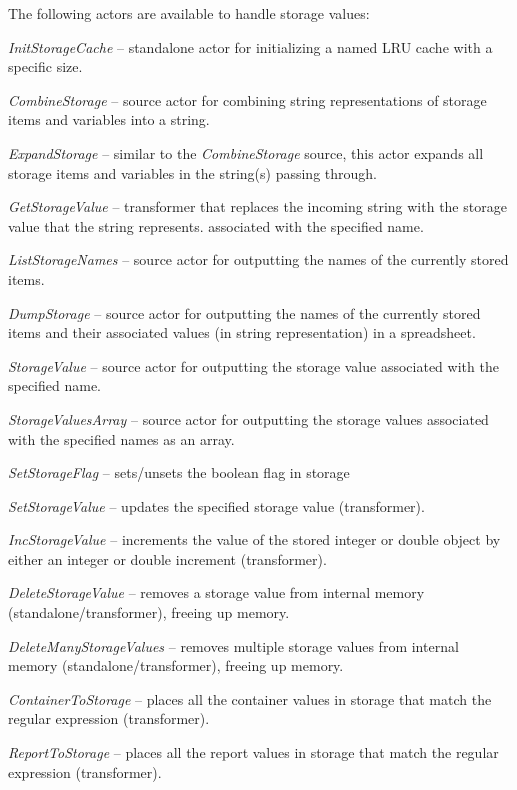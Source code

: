 The following actors are available to handle storage values:
\begin{tight_itemize}
	\item \textit{InitStorageCache} -- standalone actor for initializing a named
	LRU cache with a specific size.
	\item \textit{CombineStorage} -- source actor for combining string
	representations of storage items and variables into a string.
	\item \textit{ExpandStorage} -- similar to the \textit{CombineStorage}
	source, this actor expands all storage items and variables in the string(s)
	passing through.
	\item \textit{GetStorageValue} -- transformer that replaces the incoming
	string with the storage value that the string represents.
	associated with the specified name.
	\item \textit{ListStorageNames} -- source actor for outputting the names of
	the currently stored items.
	\item \textit{DumpStorage} -- source actor for outputting the names of
	the currently stored items and their associated values (in string
	representation) in a spreadsheet.
	\item \textit{StorageValue} -- source actor for outputting the storage value
	associated with the specified name.
	\item \textit{StorageValuesArray} -- source actor for outputting the
	storage values associated with the specified names as an array.
	\item \textit{SetStorageFlag} -- sets/unsets the boolean flag in storage
	\item \textit{SetStorageValue} -- updates the specified storage value
	(transformer).
	\item \textit{IncStorageValue} -- increments the value of the stored integer or
	double object by either an integer or double increment (transformer).
	\item \textit{DeleteStorageValue} -- removes a storage value
	from internal memory (standalone/transformer), freeing up memory.
	\item \textit{DeleteManyStorageValues} -- removes multiple storage values
	from internal memory (standalone/transformer), freeing up memory.
	\item \textit{ContainerToStorage} -- places all the container values in storage
	that match the regular expression (transformer).
	\item \textit{ReportToStorage} -- places all the report values in storage
	that match the regular expression (transformer).
\end{tight_itemize}


